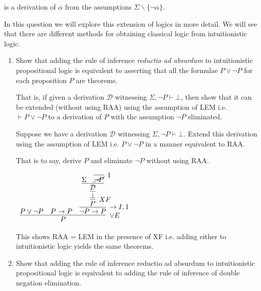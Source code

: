 \documentclass[11pt]{report}
\begin{document}
\begin{enumerate}
	is a derivation of $\alpha$ from the assumptions $\Sigma \backslash\{\lnot\alpha\}$.

	In this question we will explore this extension of logics in more detail. We will see that there are different methods for obtaining classical logic from intuitionistic logic.

		\begin{enumerate}
			\item Show that adding the rule of inference \emph{reductio ad absurdum} to intuitionistic propositional logic is equivalent to asserting that all the formulae $P \lor \lnot P$ for each proposition $P$ are theorems.
			

			That is, if given a derivation $\mathcal{D}$ witnessing $\Sigma,\lnot P \vdash \bot$, then show that it can be extended (without using RAA) using the assumption of LEM i.e. $\vdash P \lor \lnot P$ to a derivation of $P$ with the assumption $\lnot P$ eliminated.

			\hspace{0.2cm}{\bf Solution}

			Suppose we have a derivation $\mathcal{D}$ witnessing $\Sigma,\lnot P \vdash \bot$. Extend this derivation using the assumption of LEM i.e. $P\lor \lnot P$ in a manner equivalent to RAA. 

			That is to say, derive $P$ and eliminate $\lnot P$ without using RAA. 

			\begin{mdframed}
				\begin{center}
					$\begin{array}{c}
						\infer[\lor E]{P}
							{P \lor \lnot P	&
							P \to P &
							\infer[\to I,1]{\lnot P \to P}
								{\infer[XF]{P}
									{\infer[]{\bot}
										{\infer[]{\mathcal{D}}
											{\Sigma & \infer[1]{\cancel{\lnot P}}{}}}}}}
					\end{array}$
				\end{center}
			\end{mdframed}

			This shows RAA = LEM in the presence of XF i.e. adding either to intuitionistic logic yields the same theorems. 
			
			\newpage
			\item Show that adding the rule of inference reductio ad absurdum to intuitionistic propositional logic is equivalent to adding the rule of inference of double negation elimination. 
			

\end{enumerate}
\end{enumerate}
\end{document}
